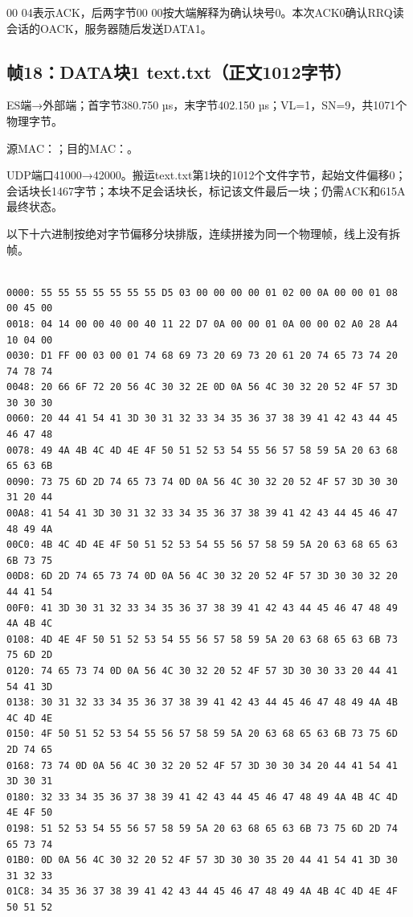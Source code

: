 00 04表示ACK，后两字节00 00按大端解释为确认块号0。本次ACK0确认RRQ读会话的OACK，服务器随后发送DATA1。

\subsection*{帧18：DATA块1 text.txt（正文1012字节）}

ES端→外部端；首字节380.750 µs，末字节402.150 µs；VL=1，SN=9，共1071个物理字节。

源MAC：；目的MAC：。

UDP端口41000→42000。搬运text.txt第1块的1012个文件字节，起始文件偏移0；会话块长1467字节；本块不足会话块长，标记该文件最后一块；仍需ACK和615A最终状态。

以下十六进制按绝对字节偏移分块排版，连续拼接为同一个物理帧，线上没有拆帧。

\par\noindent\begin{minipage}{\linewidth}
\begin{lstlisting}[caption={帧18物理字节，偏移0000--01DF}]

0000: 55 55 55 55 55 55 55 D5 03 00 00 00 00 01 02 00 0A 00 00 01 08 00 45 00
0018: 04 14 00 00 40 00 40 11 22 D7 0A 00 00 01 0A 00 00 02 A0 28 A4 10 04 00
0030: D1 FF 00 03 00 01 74 68 69 73 20 69 73 20 61 20 74 65 73 74 20 74 78 74
0048: 20 66 6F 72 20 56 4C 30 32 2E 0D 0A 56 4C 30 32 20 52 4F 57 3D 30 30 30
0060: 20 44 41 54 41 3D 30 31 32 33 34 35 36 37 38 39 41 42 43 44 45 46 47 48
0078: 49 4A 4B 4C 4D 4E 4F 50 51 52 53 54 55 56 57 58 59 5A 20 63 68 65 63 6B
0090: 73 75 6D 2D 74 65 73 74 0D 0A 56 4C 30 32 20 52 4F 57 3D 30 30 31 20 44
00A8: 41 54 41 3D 30 31 32 33 34 35 36 37 38 39 41 42 43 44 45 46 47 48 49 4A
00C0: 4B 4C 4D 4E 4F 50 51 52 53 54 55 56 57 58 59 5A 20 63 68 65 63 6B 73 75
00D8: 6D 2D 74 65 73 74 0D 0A 56 4C 30 32 20 52 4F 57 3D 30 30 32 20 44 41 54
00F0: 41 3D 30 31 32 33 34 35 36 37 38 39 41 42 43 44 45 46 47 48 49 4A 4B 4C
0108: 4D 4E 4F 50 51 52 53 54 55 56 57 58 59 5A 20 63 68 65 63 6B 73 75 6D 2D
0120: 74 65 73 74 0D 0A 56 4C 30 32 20 52 4F 57 3D 30 30 33 20 44 41 54 41 3D
0138: 30 31 32 33 34 35 36 37 38 39 41 42 43 44 45 46 47 48 49 4A 4B 4C 4D 4E
0150: 4F 50 51 52 53 54 55 56 57 58 59 5A 20 63 68 65 63 6B 73 75 6D 2D 74 65
0168: 73 74 0D 0A 56 4C 30 32 20 52 4F 57 3D 30 30 34 20 44 41 54 41 3D 30 31
0180: 32 33 34 35 36 37 38 39 41 42 43 44 45 46 47 48 49 4A 4B 4C 4D 4E 4F 50
0198: 51 52 53 54 55 56 57 58 59 5A 20 63 68 65 63 6B 73 75 6D 2D 74 65 73 74
01B0: 0D 0A 56 4C 30 32 20 52 4F 57 3D 30 30 35 20 44 41 54 41 3D 30 31 32 33
01C8: 34 35 36 37 38 39 41 42 43 44 45 46 47 48 49 4A 4B 4C 4D 4E 4F 50 51 52

\end{lstlisting}
\end{minipage}\par

